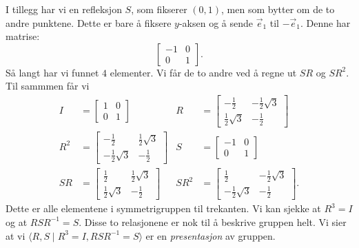 \documentclass[11pt, norsk]{article}
\begin{document}
\begin{losn}
I tillegg har vi en refleksjon $S$, som fikserer $(0,1)$, men som bytter om de to andre punktene. Dette er bare å fiksere $y$-aksen og å sende $\vec e_1$ til $-\vec e_1$. Denne har matrise:
\[
\begin{bmatrix}
-1 & 0 \\ 0 & 1
\end{bmatrix}.
\]
Så langt har vi funnet $4$ elementer. Vi får de to andre ved å regne ut $SR$ og $SR^2$. Til sammmen får vi
\begin{align*}
I &= \begin{bmatrix} 1 & 0 \\ 0 & 1 \end{bmatrix} & R &= \begin{bmatrix} - \frac 12 & -\frac 12 \sqrt{3} \\ \frac 12 \sqrt 3 & - \frac 12 \end{bmatrix} \\
R^2 &=  \begin{bmatrix} -\frac 12 & \frac 12 \sqrt{3}  \\ -\frac 12 \sqrt 3 & -\frac 12 \end{bmatrix} &
S &=  \begin{bmatrix} -1 & 0 \\ 0 & 1 \end{bmatrix} \\
SR &=  \begin{bmatrix} \frac 12  & \frac 12 \sqrt 3 \\ \frac 12 \sqrt 3 & - \frac 12 \end{bmatrix} &
SR^2 &=  \begin{bmatrix} \frac 12  & -\frac 12 \sqrt 3 \\ - \frac 12 \sqrt 3 & - \frac 12 \end{bmatrix}.
\end{align*}
Dette er alle elementene i symmetrigruppen til trekanten. Vi kan sjekke at $R^3=I$ og at $RSR^{-1}=S$. Disse to relasjonene er nok til å beskrive gruppen helt. Vi sier at vi $\langle R,S \mid R^3=I, RSR^{-1}=S \rangle$ er en \emph{presentasjon} av gruppen.



\end{losn}
\end{document}
